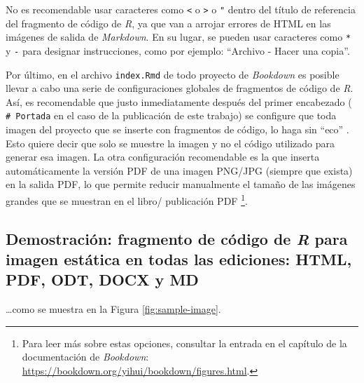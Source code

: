 \documentclass[
]{krantz}
\begin{document}
No es recomendable usar caracteres como \texttt{\textless{}} o \texttt{\textgreater{}} o \texttt{"} dentro del título de referencia del fragmento de código de \emph{R}, ya que van a arrojar errores de HTML en las imágenes de salida de \emph{Markdown}. En su lugar, se pueden usar caracteres como \texttt{*} y \texttt{-} para designar instrucciones, como por ejemplo: ``Archivo - Hacer una copia''.

Por último, en el archivo \texttt{index.Rmd} de todo proyecto de \emph{Bookdown} es posible llevar a cabo una serie de configuraciones globales de fragmentos de código de \emph{R}. Así, es recomendable que justo inmediatamente después del primer encabezado ( \texttt{\#\ Portada} en el caso de la publicación de este trabajo) se configure que toda imagen del proyecto que se inserte con fragmentos de código, lo haga sin ``eco'' . Esto quiere decir que solo se muestre la imagen y no el código utilizado para generar esa imagen. La otra configuración recomendable es la que inserta automáticamente la versión PDF de una imagen PNG/JPG (siempre que exista) en la salida PDF, lo que permite reducir manualmente el tamaño de las imágenes grandes que se muestran en el libro/ publicación PDF \footnote{Para leer más sobre estas opciones, consultar la entrada en el capítulo de la documentación de \emph{Bookdown}: \url{https://bookdown.org/yihui/bookdown/figures.html}.}.

\hypertarget{demostraciuxf3n-fragmento-de-cuxf3digo-de-r-para-imagen-estuxe1tica-en-todas-las-ediciones-html-pdf-odt-docx-y-md}{%
\subsection{\texorpdfstring{Demostración: fragmento de código de \emph{R} para imagen estática en todas las ediciones: HTML, PDF, ODT, DOCX y MD}{Demostración: fragmento de código de R para imagen estática en todas las ediciones: HTML, PDF, ODT, DOCX y MD}}\label{demostraciuxf3n-fragmento-de-cuxf3digo-de-r-para-imagen-estuxe1tica-en-todas-las-ediciones-html-pdf-odt-docx-y-md}}

\ldots como se muestra en la Figura \ref{fig:sample-image}.
\end{document}
